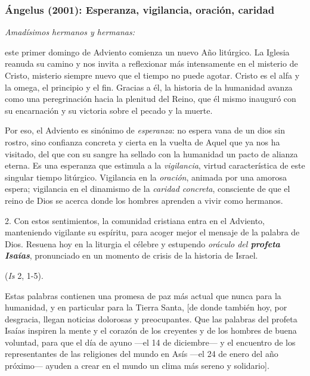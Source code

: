 \newpage
\subsubsection{Ángelus (2001): Esperanza, vigilancia, oración, caridad}


\begin{body}
	\emph{Amadísimos hermanos y hermanas:} 
	
	 este primer domingo de Adviento comienza un nuevo Año litúrgico. La Iglesia reanuda su camino y nos invita a reflexionar más intensamente en el misterio de Cristo, misterio siempre nuevo que el tiempo no puede agotar. Cristo es el alfa y la omega, el principio y el fin. Gracias a él, la historia de la humanidad avanza como una peregrinación hacia la plenitud del Reino, que él mismo inauguró con su encarnación y su victoria sobre el pecado y la muerte. 
	
	Por eso, el Adviento es sinónimo de \emph{esperanza}: no espera vana de un dios sin rostro, sino confianza concreta y cierta en la vuelta de Aquel que ya nos ha visitado, del  que con su sangre ha sellado con la humanidad un pacto de alianza eterna. Es una esperanza que estimula a la \emph{vigilancia}, virtud característica de este singular tiempo litúrgico. Vigilancia en la \emph{oración}, animada por una amorosa espera; vigilancia en el dinamismo de la \emph{caridad concreta}, consciente de que el reino de Dios se acerca donde los hombres aprenden a vivir como hermanos. 
	
	2. Con estos sentimientos, la comunidad cristiana entra en el Adviento, manteniendo vigilante su espíritu, para acoger mejor el mensaje de la palabra de Dios. Resuena hoy en la liturgia el célebre y estupendo \emph{oráculo del \textbf{profeta Isaías}}, pronunciado en un momento de crisis de la historia de Israel. 
	
	 (\emph{Is} 2, 1-5). 
	
	Estas palabras contienen una promesa de paz más actual que nunca para la humanidad, y en particular para la Tierra Santa, {[}de donde también hoy, por desgracia, llegan noticias dolorosas y preocupantes. Que las palabras del profeta Isaías inspiren la mente y el corazón de los creyentes y de los hombres de buena voluntad, para que el día de ayuno ---el 14 de diciembre--- y el encuentro de los representantes de las religiones del mundo en Asís ---el 24 de enero del año próximo--- ayuden a crear en el mundo un clima más sereno y solidario{]}. 
	

\end{body}
